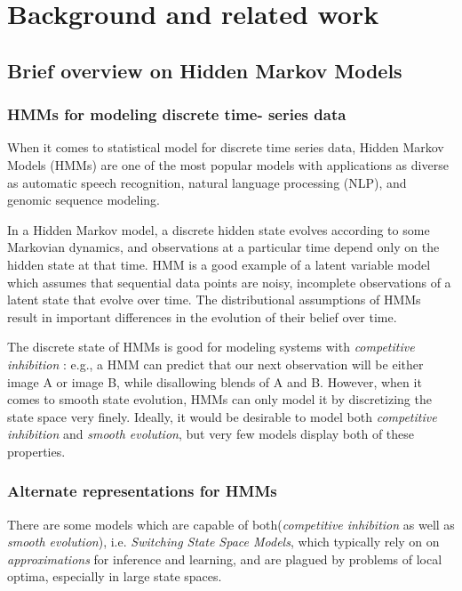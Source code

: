 \section{Background and related work}

\subsection{Brief overview on Hidden Markov Models}

\subsubsection{HMMs for modeling discrete time- series data}

When it comes to statistical model for discrete time series data, Hidden Markov Models (HMMs) \cite{ref1} are one of the most popular models with applications as diverse as automatic speech recognition, natural language processing (NLP), and genomic sequence modeling. 

In a Hidden Markov model, a discrete hidden state evolves according to some Markovian dynamics, and observations at a particular time depend only on the hidden state at that time\cite{ref2}.\newline
HMM is a good example of a latent variable model which assumes
that sequential data points are noisy, incomplete observations
of a latent state that evolve over time.
The distributional assumptions of HMMs result
in important differences in the evolution of their belief
over time.

The discrete state of HMMs is good for modeling systems with \textit{competitive inhibition} \cite{ref7}: e.g., a
HMM can predict that our next observation will be either image A or image B, while disallowing blends of A and B. \newline
\newline
However, when it comes to smooth state evolution, HMMs can only model it by discretizing the state space very finely. 
Ideally, it would be desirable to model both \textit{competitive inhibition} and \textit{smooth evolution}, but very few models display both of these properties.

\subsubsection{Alternate representations for HMMs}

There are some models which are capable of both(\textit{competitive inhibition} as well as \textit{smooth evolution}), i.e. \textit{Switching State Space
Models}\cite{ref8}, which typically rely
on on \textit{approximations} for inference and learning, and are plagued by problems of local optima, especially in large state spaces.
\par

